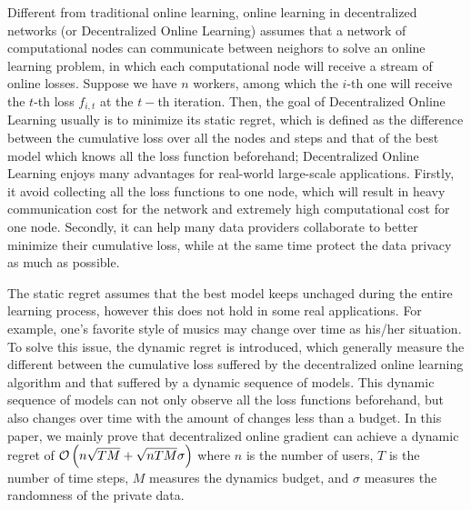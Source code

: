 \documentclass{article}
\begin{document}
Different from traditional online learning, online learning in decentralized networks (or Decentralized Online Learning) assumes that a network of computational nodes can communicate between neighors to solve an online learning problem, in which each computational node will receive a stream of online losses. Suppose we have $n$ workers, among which the $i$-th one will receive the $t$-th loss $f_{i,t}$ at the $t-$th iteration. Then, the goal of Decentralized Online Learning usually is to minimize its static regret, which is defined as the difference between the cumulative loss over all the nodes and steps and that of the best model which knows all the loss function beforehand; Decentralized Online Learning enjoys many advantages for real-world large-scale applications. Firstly, it avoid collecting all the loss functions to one node, which will result in heavy communication cost for the network and extremely high computational cost for one node. Secondly, it can help many data providers collaborate to better minimize their cumulative loss, while at the same time protect the data privacy as much as possible. 

The static regret assumes that the best model keeps unchaged during the entire learning process, however this does not hold in some real applications. For example, one's favorite style of musics may change over time as his/her situation. To solve this issue, the dynamic regret is introduced, which generally measure the different between the cumulative loss suffered by the decentralized online learning algorithm and that suffered by a dynamic sequence of models. This dynamic sequence of models can not only observe all the loss functions beforehand, but also changes over time with the amount of changes less than a budget. In this paper, we mainly prove that decentralized online gradient can achieve a dynamic regret  of ${\mathcal{O}\left( n\sqrt{TM} + \sqrt{nTM}\sigma \right)}$ where $n$ is the number of users, $T$ is the number of time steps, $M$ measures the dynamics budget, and $\sigma$ measures the randomness of the private data. 
\end{document}
